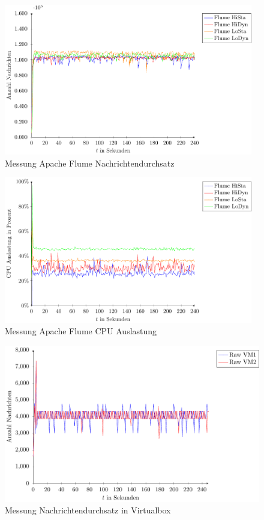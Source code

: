 \begin{figure}
\includegraphics[width=0.97\textwidth]{plots/messungFlumeDurchsatz.pdf}
\caption{Messung Apache Flume Nachrichtendurchsatz
\label{fig:messungFlumeNd}}
\end{figure}
\begin{figure}
\includegraphics[width=0.97\textwidth]{plots/messungFlumeCpu.pdf}
\caption{Messung Apache Flume CPU Auslastung
\label{fig:messungFlumeCpu}}
\end{figure}


\begin{figure}
\includegraphics[width=1.0\textwidth]{plots/virtualBoxRaw.pdf}
\caption{Messung Nachrichtendurchsatz in Virtualbox
\label{fig:messungMaxNachrichten}}
\end{figure}

